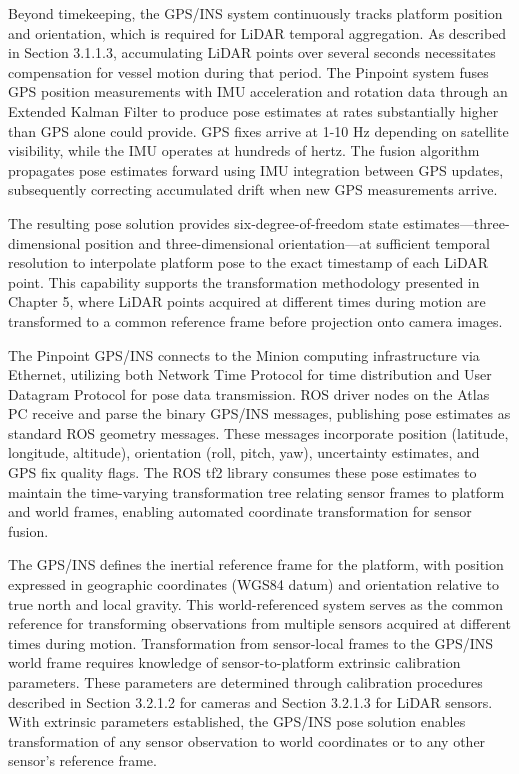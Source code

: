 \documentclass{erauthesis}
\begin{document}
Beyond timekeeping, the \ac{GPS}/\ac{INS} system continuously tracks platform position and orientation, which is required for \ac{LiDAR} temporal aggregation.
As described in Section 3.1.1.3, accumulating \ac{LiDAR} points over several seconds necessitates compensation for vessel motion during that period.
The Pinpoint system fuses \ac{GPS} position measurements with \ac{IMU} acceleration and rotation data through an Extended Kalman Filter to produce pose estimates at rates substantially higher than \ac{GPS} alone could provide.
\ac{GPS} fixes arrive at 1-10 Hz depending on satellite visibility, while the \ac{IMU} operates at hundreds of hertz.
The fusion algorithm propagates pose estimates forward using \ac{IMU} integration between \ac{GPS} updates, subsequently correcting accumulated drift when new \ac{GPS} measurements arrive.

The resulting pose solution provides six-degree-of-freedom state estimates—three-dimensional position and three-dimensional orientation—at sufficient temporal resolution to interpolate platform pose to the exact timestamp of each \ac{LiDAR} point.
This capability supports the transformation methodology presented in Chapter 5, where \ac{LiDAR} points acquired at different times during motion are transformed to a common reference frame before projection onto camera images.

The Pinpoint \ac{GPS}/\ac{INS} connects to the Minion computing infrastructure via Ethernet, utilizing both Network Time Protocol for time distribution and User Datagram Protocol for pose data transmission.
\ac{ROS} driver nodes on the Atlas PC receive and parse the binary \ac{GPS}/\ac{INS} messages, publishing pose estimates as standard \ac{ROS} geometry messages.
These messages incorporate position (latitude, longitude, altitude), orientation (roll, pitch, yaw), uncertainty estimates, and \ac{GPS} fix quality flags.
The \ac{ROS} tf2 library consumes these pose estimates to maintain the time-varying transformation tree relating sensor frames to platform and world frames, enabling automated coordinate transformation for sensor fusion.

The \ac{GPS}/\ac{INS} defines the inertial reference frame for the platform, with position expressed in geographic coordinates (WGS84 datum) and orientation relative to true north and local gravity.
This world-referenced system serves as the common reference for transforming observations from multiple sensors acquired at different times during motion.
Transformation from sensor-local frames to the \ac{GPS}/\ac{INS} world frame requires knowledge of sensor-to-platform extrinsic calibration parameters.
These parameters are determined through calibration procedures described in Section 3.2.1.2 for cameras and Section 3.2.1.3 for \ac{LiDAR} sensors.
With extrinsic parameters established, the \ac{GPS}/\ac{INS} pose solution enables transformation of any sensor observation to world coordinates or to any other sensor's reference frame.
\end{document}

